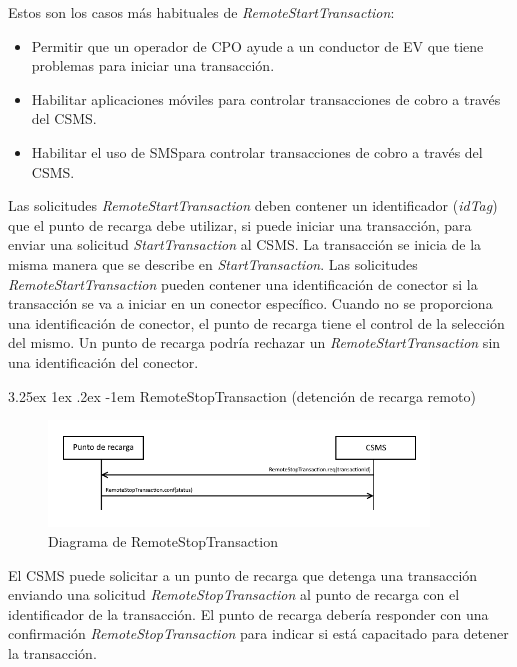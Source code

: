 \documentclass[12pt,a4paper,onecolumn,oneside]{report}
\makeatletter
\renewcommand\paragraph{\@startsection{paragraph}{5}{\z@}%
  {3.25ex \@plus1ex \@minus.2ex}%
  {-1em}%
  {\normalfont\normalsize\bfseries}}
\makeatother
\begin{document}
Estos son los casos más habituales de \textit{RemoteStartTransaction}:
\begin{itemize}
\item Permitir que un operador de CPO ayude a un conductor de EV que tiene problemas para iniciar una transacción.
\item Habilitar aplicaciones móviles para controlar transacciones de cobro a través del CSMS.
\item Habilitar el uso de SMSpara controlar transacciones de cobro a través del CSMS.

\end{itemize}

Las solicitudes \textit{RemoteStartTransaction} deben contener un identificador (\textit{idTag}) que el punto de recarga debe utilizar, si puede iniciar una transacción, para enviar una solicitud \textit{StartTransaction} al CSMS. La transacción se inicia de la misma manera que se describe en \textit{StartTransaction}. Las solicitudes \textit{RemoteStartTransaction} pueden contener una identificación de conector si la transacción se va a iniciar en un conector específico. Cuando no se proporciona una identificación de conector, el punto de recarga tiene el control de la selección del mismo. Un punto de recarga podría rechazar un \textit{RemoteStartTransaction} sin una identificación del conector.


\paragraph{RemoteStopTransaction (detención de recarga remoto)}
\label{RemoteStopTransaction (detención de recarga remoto)}


\begin{figure}[H] 
\centering
  \includegraphics[width=0.9\textwidth]{figuras/diagramaremotestoptransaction.png}
  \caption[Diagrama de \textit{RemoteStopTransaction}]{Diagrama de RemoteStopTransaction\\
  }
  \label{fig:diagramaremotestoptransaction}
\end{figure}


El CSMS puede solicitar a un punto de recarga que detenga una transacción enviando una solicitud \textit{RemoteStopTransaction} al punto de recarga con el identificador de la transacción. El punto de recarga debería responder con una confirmación \textit{RemoteStopTransaction} para indicar si está capacitado para detener la transacción.
\end{document}
